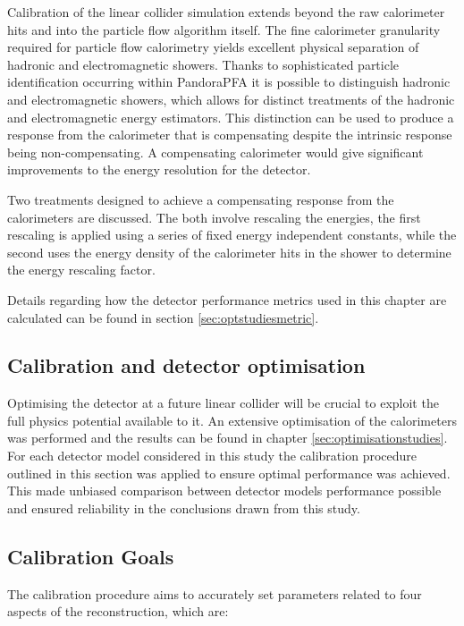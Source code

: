 Calibration of the linear collider simulation extends beyond the raw calorimeter hits and into the particle flow algorithm itself.  The fine calorimeter granularity required for particle flow calorimetry yields excellent physical separation of hadronic and electromagnetic showers.  Thanks to sophisticated particle identification occurring within PandoraPFA it is possible to distinguish hadronic and electromagnetic showers, which allows for distinct treatments of the hadronic and electromagnetic energy estimators.  This distinction can be used to produce a response from the calorimeter that is compensating despite the intrinsic response being non-compensating.  A compensating calorimeter would give significant improvements to the energy resolution for the detector.

Two treatments designed to achieve a compensating response from the calorimeters are discussed.  The both involve rescaling the energies, the first rescaling is applied using a series of fixed energy independent constants, while the second uses the energy density of the calorimeter hits in the shower to determine the energy rescaling factor.

Details regarding how the detector performance metrics used in this chapter are calculated can be found in section \ref{sec:optstudiesmetric}.


\subsection{Calibration and detector optimisation}
Optimising the detector at a future linear collider will be crucial to exploit the full physics potential available to it.  An extensive optimisation of the calorimeters was performed and the results can be found in chapter \ref{sec:optimisationstudies}.  For each detector model considered in this study the calibration procedure outlined in this section was applied to ensure optimal performance was achieved.  This made unbiased comparison between detector models performance possible and ensured reliability in the conclusions drawn from this study.


\subsection{Calibration Goals}
The calibration procedure aims to accurately set parameters related to four aspects of the reconstruction, which are:


